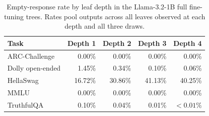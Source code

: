 \documentclass{article}
\theoremstyle{definition}
\theoremstyle{plain}
\begin{document}
\begin{table}[h]
\caption{Empty-response rate by leaf depth in the Llama-3.2-1B full fine-tuning trees. Rates
  pool outputs across all leaves observed at each depth and all three draws.}
\label{tab:eos-depth}
\centering
\small
\begin{tabular}{lrrrr}
\toprule
Task & Depth 1 & Depth 2 & Depth 3 & Depth 4 \\
\midrule
ARC-Challenge & 0.00\% & 0.00\% & 0.00\% & 0.00\% \\
Dolly open-ended & 1.45\% & 0.34\% & 0.10\% & 0.06\% \\
HellaSwag & 16.72\% & 30.86\% & 41.13\% & 40.25\% \\
MMLU & 0.00\% & 0.00\% & 0.00\% & 0.00\% \\
TruthfulQA & 0.10\% & 0.04\% & 0.01\% & $<0.01\%$ \\
\bottomrule
\end{tabular}
\end{table}

\end{document}
